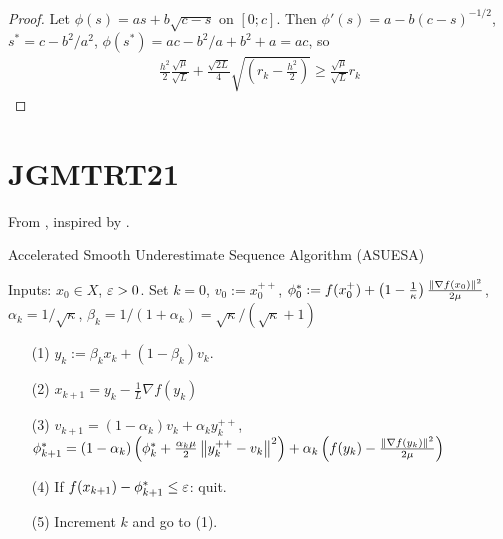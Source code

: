 \documentclass[12pt,english]{article}
\begin{document}
\begin{proof}
Let $\phi(s) = as + b\sqrt{c-s}$ on $[0;c]$. Then $\phi'(s) = a - b(c-s)^{-1/2}$, $s^* = c - b^2/a^2$, 
$\phi(s^*) = ac - b^2/a + b^2+a = ac$, so
%
\begin{align*}
\frac{h^2}{2}\frac{\sqrt{\mu}}{\sqrt{L}}  
+\frac{\sqrt{2L}}{4}\sqrt{(r_k - \frac{h^2}{2})} \ge \frac{\sqrt{\mu}}{\sqrt{L}} r_k
\end{align*}
%
\end{proof}
%



%
\section{JGMTRT21}\label{sec:}
%
From \cite{JahaniGudapatiMa21}, inspired by \cite{DrusvyatskiyFazelRoy18a}.

%
\begin{yellow}
\begin{algorithm}[H]
\caption{Accelerated Smooth Underestimate Sequence Algorithm (ASUESA)} 
\label{algorithm:QA} 
%
Inputs: $x_0\in X$, $\varepsilon>0$. Set $k=0$, $v_0:=x_0^{++}$, $\phi^*_0:=f(x_0^+)+\left(1-\frac{1}{\kappa}\right)\frac{\left\|\nabla f(x_0)\right\|^2}{2\mu}$, $\alpha_k = 1/\sqrt{\kappa}$, $\beta_k=1/(1+\alpha_k)=\sqrt{\kappa}/(\sqrt{\kappa}+1)$
%
\begin{itemize}
\item[(1)] $y_{k} := \beta_k x_k + (1-\beta_k)v_k$.
\item[(2)] $x_{k+1} = y_k - \frac{1}{L}\nabla f(y_k)$
\item[(3)] $v_{k+1} = (1-\alpha_k) v_k + \alpha_k y_k^{++}$,\\ 
$\phi^*_{k+1}=(1-\alpha_k)\left(\phi^*_k+\frac{\alpha_k\mu}{2}\left\|y_k^{++}-v_k\right\|^2\right) + \alpha_k\left(f(y_k) -\frac{\left\|\nabla f(y_k)\right\|^2}{2\mu} \right)$
\item[(4)] If $f(x_{k+1})-\phi^*_{k+1} \le \varepsilon$: quit.
\item[(5)] Increment $k$ and go to (1).
\end{itemize}
%
\end{algorithm}
\end{yellow}
\end{document}
